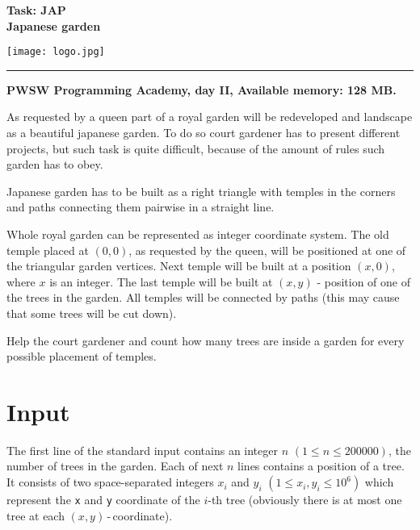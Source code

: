 \documentclass[10pt]{article}
\begin{document}
    

    \noindent
    \begin{minipage}{0.5\textwidth}
        \LARGE{\textsf{\textbf{Task: JAP\\Japanese garden}}}
    \end{minipage}
    \begin{minipage}{0.5\textwidth}
        \begin{flushright}
            \texttt{[image: logo.jpg]}
        \end{flushright}
    \end{minipage}
    
    \noindent\rule{\textwidth}{0.4pt}
    
    \noindent\textbf{PWSW Programming Academy, day II, Available memory: 128 MB.}
    \vspace{1em}
    
    
    \noindent
    As requested by a queen part of a royal garden will be redeveloped and landscape as a beautiful japanese garden. To do so court gardener has to present different projects, but such task is quite difficult, because of the amount of rules such garden has to obey.
    
    Japanese garden has to be built as a right triangle with temples in the corners and paths connecting them pairwise in a straight line.
    
    Whole royal garden can be represented as integer coordinate system. The old temple placed at $(0, 0)$, as requested by the queen, will be positioned at one of the triangular garden vertices. Next temple will be built at a position $(x, 0)$, where $x$ is an integer. The last temple will be built at $(x, y)$ - position of one of the trees in the garden. All temples will be connected by paths (this may cause that some trees will be cut down).
    
    Help the court gardener and count how many trees are inside a garden for every possible placement of temples.   


    \section*{Input}
    
    The first line of the standard input contains an integer $n$ $(1\leq n\leq 200000)$, the number of trees in the garden. Each of next $n$ lines contains a position of a tree. It consists of two space-separated integers $x_{i}$ and $y_{i}$ $(1\leq x_{i}, y_{i}\leq 10^{6})$ which represent the \texttt{x} and \texttt{y} coordinate of the $i$-th tree (obviously there is at most one tree at each $(x, y)$\,-\,coordinate).
\end{document}

